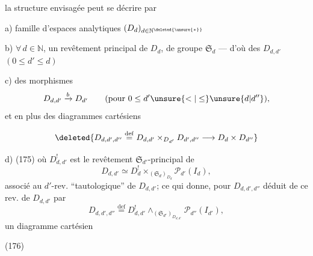 la structure envisagée peut se décrire par

 a) famille d'espaces analytiques $(D_d)_{d\in\mathbb N^{\deleted{\unsure{*}}}}$

 b) $\forall\,d\in\mathbb N$, un revêtement principal  de $D_d$, de groupe $\mathfrak S_d$ --- d'où des $D_{d,d'}$ $(0\leq d'\leq d)$


 c) des morphismes
\[
D_{d,d'}\xrightarrow{b}D_{d'}\qquad(\text{pour }0\leq d'\unsure{<|\leq}\unsure{d|d''}),
\]
et en plus des diagrammes cartésiens

\[
\deleted{D_{d,d',d''}\overset{\mathrm{def}}{=}D_{d,d'}\mathbin\times_{D_{d'}}D_{d',d''}\longrightarrow D_d\mathbin\times D_{d''}}
\]

 d) \quad(175)
où $D^!_{d,d'}$ est le revêtement $\mathfrak S_{d'}$-principal de
\[
D_{d,d'}\simeq D^!_d\mathbin\times_{(\mathfrak S_d)_{D_d}}\mathcal P_{d'}(I_d),
\]
associé au $d'$-rev. ``tautologique'' de $D_{d,d'}$; ce qui donne, pour $D_{d,d',d''}$ déduit de ce rev. de $D_{d,d'}$ par
\[
D_{d,d',d''}\overset{\mathrm{def}}{=}D^!_{d,d'}\mathbin\wedge_{(\mathfrak S_{d'})_{D_{d,d'}}}\mathcal P_{d''}(I_{d'}),
\]
un  diagramme cartésien

(176)\quad
{}
